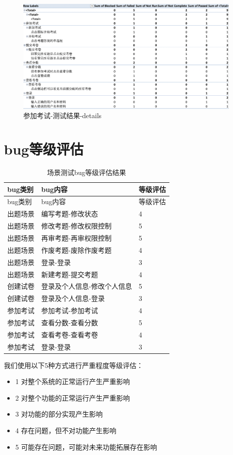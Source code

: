 \documentclass[hyperref, a4paper]{ctexart}
\providecommand{\tightlist}{%
  \setlength{\itemsep}{0pt}\setlength{\parskip}{0pt}}
\begin{document}
\begin{figure}
\centering
\includegraphics{screenshoots/PivotTable_Details_3.png}
\caption{参加考试-测试结果-details}
\end{figure}

\hypertarget{bugux7b49ux7ea7ux8bc4ux4f30}{%
\section{bug等级评估}\label{bugux7b49ux7ea7ux8bc4ux4f30}}

\begin{longtable}[]{@{}lll@{}}
\caption{场景测试bug等级评估结果}\tabularnewline
\toprule
bug类别 & bug内容 & 等级评估\tabularnewline
\midrule
\endfirsthead
\toprule
bug类别 & bug内容 & 等级评估\tabularnewline
\midrule
\endhead
出题场景 & 编写考题-修改状态 & 4\tabularnewline
出题场景 & 修改考题-修改权限控制 & 5\tabularnewline
出题场景 & 再审考题-再审权限控制 & 5\tabularnewline
出题场景 & 作废考题-废除作废考题 & 4\tabularnewline
出题场景 & 登录-登录 & 3\tabularnewline
出题场景 & 新建考题-提交考题 & 4\tabularnewline
创建试卷 & 登录及个人信息-修改个人信息 & 5\tabularnewline
创建试卷 & 登录及个人信息-登录 & 3\tabularnewline
参加考试 & 参加考试-参加考试 & 4\tabularnewline
参加考试 & 查看分数-查看分数 & 5\tabularnewline
参加考试 & 查看考卷-查看考卷 & 4\tabularnewline
参加考试 & 登录-登录 & 3\tabularnewline
\bottomrule
\end{longtable}

\pagebreak

我们使用以下5种方式进行严重程度等级评估：

\begin{itemize}
\tightlist
\item
  1 对整个系统的正常运行产生严重影响
\item
  2 对整个功能的正常运行产生严重影响
\item
  3 对功能的部分实现产生影响
\item
  4 存在问题，但不对功能产生影响
\item
  5 可能存在问题，可能对未来功能拓展存在影响
\end{itemize}
\end{document}
